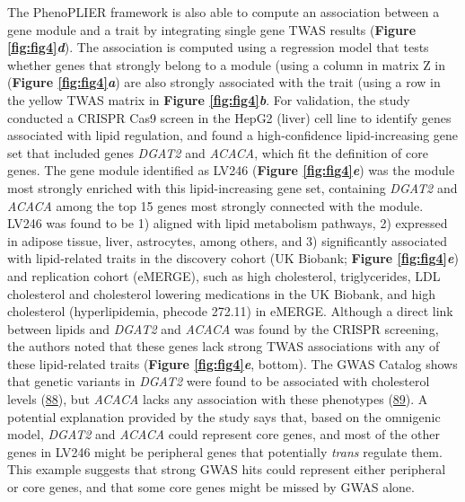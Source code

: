 The PhenoPLIER framework is also able to compute an association between a gene module and a trait by integrating single gene TWAS results (\textbf{Figure \ref{fig:fig4}\emph{d}}).
The association is computed using a regression model that tests whether genes that strongly belong to a module (using a column in matrix Z in (\textbf{Figure \ref{fig:fig4}\emph{a}}) are also strongly associated with the trait (using a row in the yellow TWAS matrix in \textbf{Figure \ref{fig:fig4}\emph{b}}.
For validation, the study conducted a CRISPR Cas9 screen in the HepG2 (liver) cell line to identify genes associated with lipid regulation, and found a high-confidence lipid-increasing gene set that included genes \emph{DGAT2} and \emph{ACACA}, which fit the definition of core genes.
The gene module identified as LV246 (\textbf{Figure \ref{fig:fig4}\emph{e}}) was the module most strongly enriched with this lipid-increasing gene set, containing \emph{DGAT2} and \emph{ACACA} among the top 15 genes most strongly connected with the module.
LV246 was found to be 1) aligned with lipid metabolism pathways, 2) expressed in adipose tissue, liver, astrocytes, among others, and 3) significantly associated with lipid-related traits in the discovery cohort (UK Biobank; \textbf{Figure \ref{fig:fig4}\emph{e}}) and replication cohort (eMERGE), such as high cholesterol, triglycerides, LDL cholesterol and cholesterol lowering medications in the UK Biobank, and high cholesterol (hyperlipidemia, phecode 272.11) in eMERGE.
Although a direct link between lipids and \emph{DGAT2} and \emph{ACACA} was found by the CRISPR screening, the authors noted that these genes lack strong TWAS associations with any of these lipid-related traits (\textbf{Figure \ref{fig:fig4}\emph{e}}, bottom).
The GWAS Catalog shows that genetic variants in \emph{DGAT2} were found to be associated with cholesterol levels (\protect\hyperlink{ref-xJjWGVyN}{88}), but \emph{ACACA} lacks any association with these phenotypes (\protect\hyperlink{ref-1GM0PmkWn}{89}).
A potential explanation provided by the study says that, based on the omnigenic model, \emph{DGAT2} and \emph{ACACA} could represent core genes, and most of the other genes in LV246 might be peripheral genes that potentially \emph{trans} regulate them.
This example suggests that strong GWAS hits could represent either peripheral or core genes, and that some core genes might be missed by GWAS alone.

